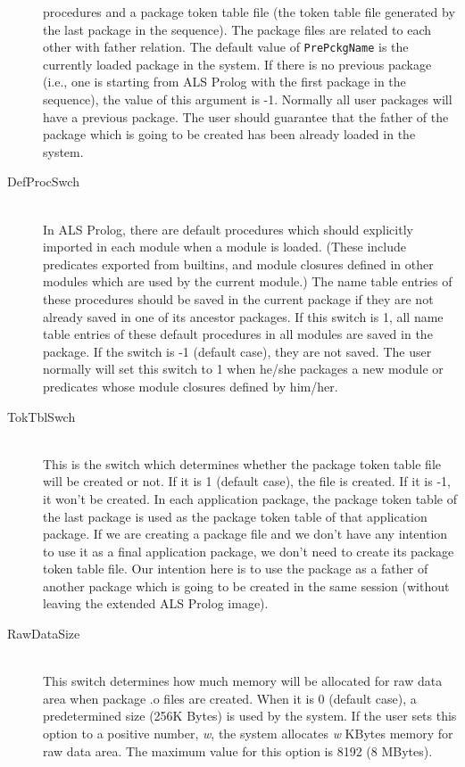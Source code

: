 \begin{description}
procedures and a package token table file (the token table file generated by
the last package in the sequence).
The package files are related to each other
with father relation. The default value of \verb|PrePckgName| is 
the currently loaded package in the system. If there is no
previous package (i.e., one is starting from ALS Prolog with the first package in the sequence), 
the value of this argument is -1. Normally
all user packages will have a previous package. The user should
guarantee that the father of the package which is going to be created
has been already loaded in the system. 
\item[DefProcSwch] \ \\
In ALS Prolog, there are default procedures which should
explicitly imported in each module when a module is loaded.
(These include predicates exported from builtins, and module closures
defined in other modules which are used by the current module.)
The name table entries of these procedures should be saved in
the current package if they are not already saved in one of its ancestor
packages. If this switch is 1, all name table entries
of these default procedures in all modules are saved in the package.
If the switch is -1 (default case), they are not saved. 
The user normally will set this switch to 1 when he/she packages a new module
or predicates whose module closures defined by him/her.
\item[TokTblSwch] \ \\
This is the switch which determines whether the package token table
file will be created or not. If it is 1 (default case), the file
is created. If it is -1, it won't be created. In each application
package, the package token table of the last package is used
as the package token table of that application package.
If we are creating a package file and we don't have any intention to
use it as a final application package, we don't need to create its 
package token table file. Our intention here is to use the package as 
a father of another package which is going to be created in the same
session (without leaving the extended ALS Prolog image).
\item[RawDataSize] \ \\
This switch determines how much memory will be allocated for raw data area
when package .o files are created. When it is 0 (default case), 
a predetermined size (256K Bytes) is used by the system.
If the user sets this option to a positive number, \emph{w}, the system
allocates \emph{w} KBytes memory for raw data area.  
The maximum value for this option is 8192 (8 MBytes).

\end{description}
